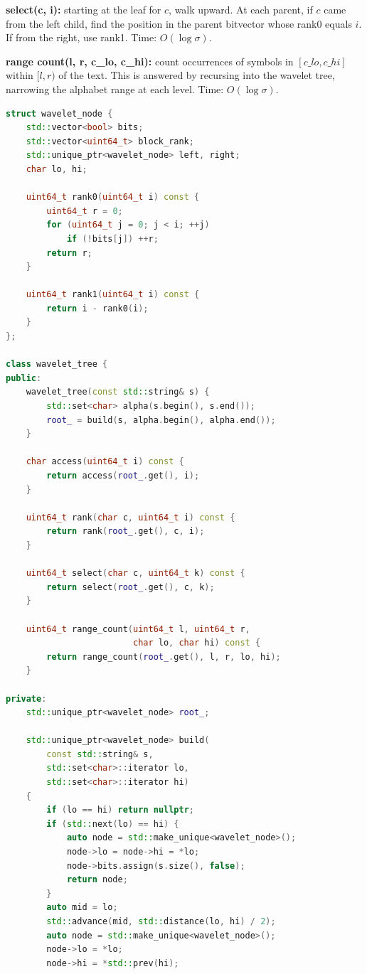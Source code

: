 \textbf{select(c, i):} starting at the leaf for $c$, walk upward. At each parent, if $c$ came from the left child, find the position in the parent bitvector whose rank0 equals $i$. If from the right, use rank1. Time: $O(\log \sigma)$.

\textbf{range count(l, r, c\_lo, c\_hi):} count occurrences of symbols in $[c\_lo, c\_hi]$ within $[l, r)$ of the text. This is answered by recursing into the wavelet tree, narrowing the alphabet range at each level. Time: $O(\log \sigma)$.

\begin{lstlisting}[language=C++]
struct wavelet_node {
    std::vector<bool> bits;
    std::vector<uint64_t> block_rank;
    std::unique_ptr<wavelet_node> left, right;
    char lo, hi;

    uint64_t rank0(uint64_t i) const {
        uint64_t r = 0;
        for (uint64_t j = 0; j < i; ++j)
            if (!bits[j]) ++r;
        return r;
    }

    uint64_t rank1(uint64_t i) const {
        return i - rank0(i);
    }
};

class wavelet_tree {
public:
    wavelet_tree(const std::string& s) {
        std::set<char> alpha(s.begin(), s.end());
        root_ = build(s, alpha.begin(), alpha.end());
    }

    char access(uint64_t i) const {
        return access(root_.get(), i);
    }

    uint64_t rank(char c, uint64_t i) const {
        return rank(root_.get(), c, i);
    }

    uint64_t select(char c, uint64_t k) const {
        return select(root_.get(), c, k);
    }

    uint64_t range_count(uint64_t l, uint64_t r,
                         char lo, char hi) const {
        return range_count(root_.get(), l, r, lo, hi);
    }

private:
    std::unique_ptr<wavelet_node> root_;

    std::unique_ptr<wavelet_node> build(
        const std::string& s,
        std::set<char>::iterator lo,
        std::set<char>::iterator hi)
    {
        if (lo == hi) return nullptr;
        if (std::next(lo) == hi) {
            auto node = std::make_unique<wavelet_node>();
            node->lo = node->hi = *lo;
            node->bits.assign(s.size(), false);
            return node;
        }
        auto mid = lo;
        std::advance(mid, std::distance(lo, hi) / 2);
        auto node = std::make_unique<wavelet_node>();
        node->lo = *lo;
        node->hi = *std::prev(hi);


\end{lstlisting}
